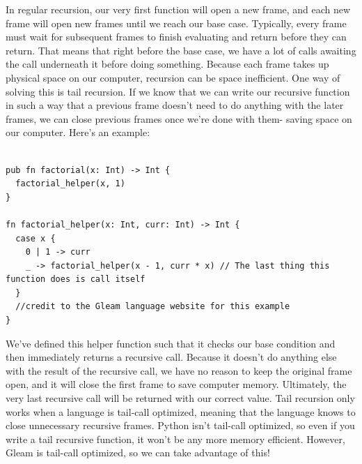 \begin{blocksection}
In regular recursion, our very first function will open a new frame, and each new frame will open new frames until we reach our base case. Typically, every frame must wait for subsequent frames to finish evaluating and return before they can return. That means that right before the base case, we have a lot of calls awaiting the call underneath it before doing something. Because each frame takes up physical space on our computer, recursion can be space inefficient. One way of solving this is tail recursion. If we know that we can write our recursive function in such a way that a previous frame doesn't need to do anything with the later frames, we can close previous frames once we're done with them- saving space on our computer. 
Here's an example: 
\begin{lstlisting}

pub fn factorial(x: Int) -> Int {
  factorial_helper(x, 1)
}

fn factorial_helper(x: Int, curr: Int) -> Int {
  case x {
    0 | 1 -> curr
    _ -> factorial_helper(x - 1, curr * x) // The last thing this function does is call itself
  }
  //credit to the Gleam language website for this example
}
\end{lstlisting}
We've defined this helper function such that it checks our base condition and then immediately returns a recursive call. Because it doesn't do anything else with the result of the recursive call, we have no reason to keep the original frame open, and it will close the first frame to save computer memory. Ultimately, the very last recursive call will be returned with our correct value.
Tail recursion only works when a language is tail-call optimized, meaning that the language knows to close unnecessary recursive frames. Python isn't tail-call optimized, so even if you write a tail recursive function, it won't be any more memory efficient. However, Gleam is tail-call optimized, so we can take advantage of this!
\end{blocksection}